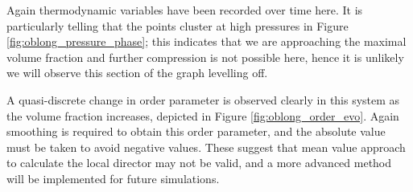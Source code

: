 \documentclass[11pt, a4paper]{article} %
\begin{document}
Again thermodynamic variables have been recorded over time here. It is particularly telling that the points cluster at high pressures in Figure \ref{fig:oblong_pressure_phase}; this indicates that we are approaching the maximal volume fraction and further compression is not possible here, hence it is unlikely we will observe this section of the graph levelling off.

A quasi-discrete change in order parameter is observed clearly in this system as the volume fraction increases, depicted in Figure \ref{fig:oblong_order_evo}. Again smoothing is required to obtain this order parameter, and the absolute value must be taken to avoid negative values. These suggest that mean value approach to calculate the local director may not be valid, and a more advanced method will be implemented for future simulations.

\printbibliography
\end{document}
